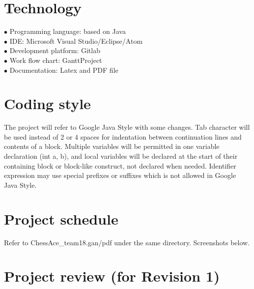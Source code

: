 \documentclass[12pt,letterpaper]{article}
\begin{document}
\section{Technology}
$\bullet$ Programming language: based on Java\\
$\bullet$ IDE: Microsoft Visual Studio/Eclipse/Atom\\
$\bullet$ Development platform: Gitlab\\
$\bullet$ Work flow chart: GanttProject\\
$\bullet$ Documentation: Latex and PDF file\\
 
\section{Coding style}
The project will refer to Google Java Style with some changes. Tab character will be used instead of 2 or 4 spaces for indentation between continuation lines and contents of a block. Multiple variables will be permitted in one variable declaration (int a, b), and local variables will be declared at the start of their containing block or block-like construct, not declared when needed. Identifier expression may use special prefixes or suffixes which is not allowed in Google Java Style.\\

\section{Project schedule}
	Refer to ChessAce\_team18.gan/pdf under the same directory. Screenshots below.


\section{Project review (for Revision 1)}
\end{document}
